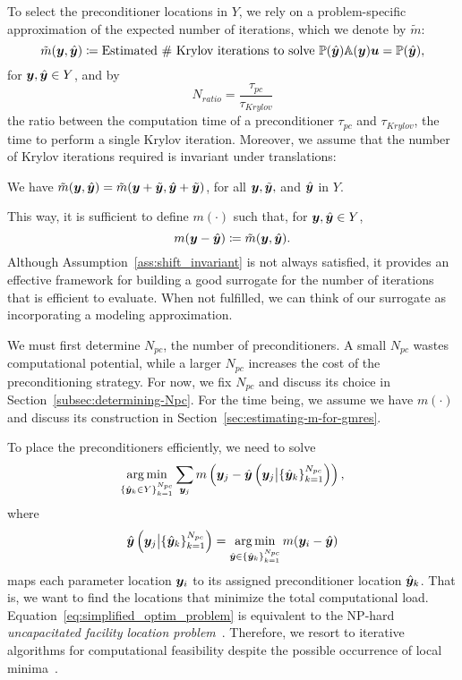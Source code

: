 To select the preconditioner locations in $Y$, we rely on a problem-specific approximation of the expected number of iterations, which we denote by $\tilde{m}$:
\begin{equation*}
    \tilde{m}({\bm{y}},\hat{{\bm{y}}}) \coloneqq \text{Estimated $\#$ Krylov iterations to solve }\mathbb{P}(\hat{\bm{y}})\mathbb{A}({\bm{y}}){\bm{u}}=\mathbb{P}(\hat{\bm{y}}),
\end{equation*}
for ${\bm{y}},\hat{\bm{y}} \in Y$, and by
\begin{equation}
    N_{ratio} = \frac{\tau_{pc}}{\tau_{Krylov}}\label{eq:Nratio}
\end{equation}
the ratio between the computation time of a preconditioner $\tau_{pc}$ and $\tau_{Krylov}$, the time to perform a single Krylov iteration.
Moreover, we assume that the number of Krylov iterations required is invariant under translations:
\begin{assumption}\label{ass:shift_invariant}
We have $\tilde{m}({\bm{y}},\hat{{\bm{y}}}) = \tilde{m}({\bm{y}}+\tilde{{\bm{y}}},\hat{{\bm{y}}}+\tilde{{\bm{y}}})$, for all ${\bm{y}}, \tilde{{\bm{y}}},$ and $\hat{{\bm{y}}}$ in $Y$.
\end{assumption}
This way, it is sufficient to define $m(\cdot)$ such that, for ${\bm{y}},\hat{\bm{y}}\in Y$,
\begin{equation*}
    m({\bm{y}} - \hat{{\bm{y}}}) \coloneqq  \tilde{m}({\bm{y}},\hat{{\bm{y}}}).
\end{equation*}
Although Assumption~\ref{ass:shift_invariant} is not always satisfied, it provides an effective framework for building a good surrogate for the number of iterations that is efficient to evaluate.
When not fulfilled, we can think of our surrogate as incorporating a modeling approximation.

We must first determine $N_{pc}$, the number of preconditioners.
A small $N_{pc}$ wastes computational potential, while a larger $N_{pc}$ increases the cost of the preconditioning strategy.
For now, we fix $N_{pc}$ and discuss its choice in Section~\ref{subsec:determining-Npc}.
For the time being, we assume we have $m(\cdot)$ and discuss its construction in Section~\ref{sec:estimating-m-for-gmres}.

To place the preconditioners efficiently, we need to solve
\begin{equation}
    \operatorname*{arg\,min}_{\{\hat{{\bm{y}}}_k\in Y\}_{k=1}^{N_{pc}}} \sum_{{\bm{y}}_j} m\left({\bm{y}}_j-\hat{{\bm{y}}}\left({\bm{y}}_j\big|\{\hat{{\bm{y}}}_k\}_{k=1}^{N_{pc}}\right)\right),\label{eq:simplified_optim_problem}
\end{equation}
where
\begin{equation*}
    \hat{{\bm{y}}}\left({\bm{y}}_j\big|\{\hat{{\bm{y}}}_k\}_{k=1}^{N_{pc}}\right)=\operatorname*{arg\,min}_{\hat{\bm{y}}\in \{\hat{{\bm{y}}}_k\}_{k=1}^{N_{pc}}} m({\bm{y}_i}-\hat{\bm{y}})
\end{equation*}
maps each parameter location ${\bm{y}_i}$ to its assigned preconditioner location $\hat{\bm{y}}_k$.
That is, we want to find the locations that minimize the total computational load.
Equation~\eqref{eq:simplified_optim_problem} is equivalent to the NP-hard \emph{uncapacitated facility location problem}~\cite{brimberg2008,sherali1988}.
Therefore, we resort to iterative algorithms for computational feasibility despite the possible occurrence of local minima~\cite{church2022}.

